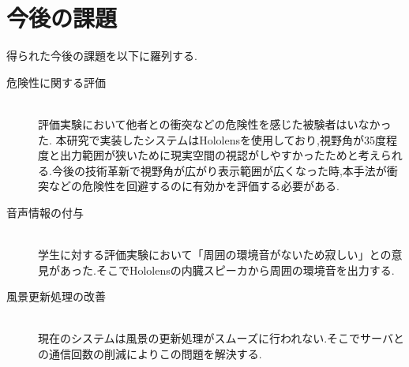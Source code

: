 \section{今後の課題}
得られた今後の課題を以下に羅列する.

\begin{description}
	\item[危険性に関する評価]\mbox{}\\
	    評価実験において他者との衝突などの危険性を感じた被験者はいなかった.
	    本研究で実装したシステムはHololensを使用しており,視野角が35度程度と出力範囲が狭いために現実空間の視認がしやすかったためと考えられる.今後の技術革新で視野角が広がり表示範囲が広くなった時,本手法が衝突などの危険性を回避するのに有効かを評価する必要がある.
	\item[音声情報の付与]\mbox{}\\
		学生に対する評価実験において「周囲の環境音がないため寂しい」との意見があった.そこでHololensの内臓スピーカから周囲の環境音を出力する.
	\item[風景更新処理の改善]\mbox{}\\
        現在のシステムは風景の更新処理がスムーズに行われない.そこでサーバとの通信回数の削減によりこの問題を解決する.
	
\end{description}
